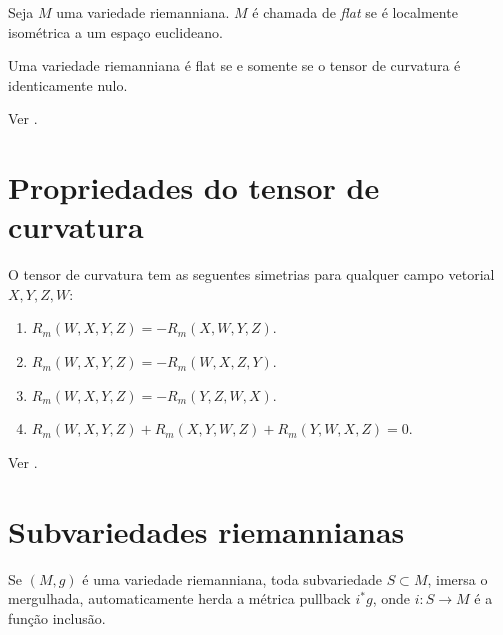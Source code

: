 \begin{definicao}
	Seja $M$ uma variedade riemanniana.
	$M$ é chamada de \emph{flat} se é localmente isométrica a um espaço euclideano.
\end{definicao}

\begin{teorema}
	Uma variedade riemanniana é flat se e somente se o tensor de curvatura é identicamente nulo.
\end{teorema}

\begin{demonstracao}
	Ver \cite[Theorem 7.3]{Lee1997}.
\end{demonstracao}


\section{Propriedades do tensor de curvatura}

\begin{proposicao}\label{simetrias-del-tensor-de-curvatura}
	O tensor de curvatura tem as seguentes simetrias para qualquer campo vetorial $X,Y,Z,W$:
	\begin{enumerate}
		\item $R_m(W,X,Y,Z) = -R_m(X,W,Y,Z)$.
		\item $R_m(W,X,Y,Z) = -R_m(W,X,Z,Y)$.
		\item $R_m(W,X,Y,Z) = -R_m(Y,Z,W,X)$.
		\item $R_m(W,X,Y,Z) + R_m(X,Y,W,Z) + R_m(Y,W,X,Z) = 0$.
	\end{enumerate}
\end{proposicao}

\begin{demonstracao}
	Ver \cite[Proposition 7.4]{Lee1997}.
\end{demonstracao}








\section{Subvariedades riemannianas}

\begin{observacao}
	Se $(M,g)$ é uma variedade riemanniana, toda subvariedade $S \subset M$, imersa o mergulhada, automaticamente herda a métrica pullback $i^* g$, onde $i: S \rightarrow M$ é a função inclusão.
\end{observacao}

